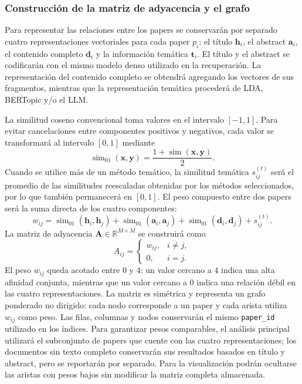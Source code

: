 \documentclass[conference]{IEEEtran}
\begin{document}
\subsubsection{Construcción de la matriz de adyacencia y el grafo}

Para representar las relaciones entre los papers se conservarán por separado cuatro representaciones vectoriales para cada paper $p_i$: el título $\mathbf{h}_i$, el abstract $\mathbf{a}_i$, el contenido completo $\mathbf{d}_i$ y la información temática $\mathbf{t}_i$. El título y el abstract se codificarán con el mismo modelo denso utilizado en la recuperación. La representación del contenido completo se obtendrá agregando los vectores de sus fragmentos, mientras que la representación temática procederá de LDA, BERTopic y/o el LLM.

La similitud coseno convencional toma valores en el intervalo $[-1,1]$. Para evitar cancelaciones entre componentes positivos y negativos, cada valor se transformará al intervalo $[0,1]$ mediante
\begin{equation}
\operatorname{sim}_{01}(\mathbf{x},\mathbf{y})=
\frac{1+\operatorname{sim}(\mathbf{x},\mathbf{y})}{2}.
\label{eq:coseno-reescalado}
\end{equation}
Cuando se utilice más de un método temático, la similitud temática $s_{ij}^{(t)}$ será el promedio de las similitudes reescaladas obtenidas por los métodos seleccionados, por lo que también permanecerá en $[0,1]$. El peso compuesto entre dos papers será la suma directa de los cuatro componentes:
\begin{equation}
w_{ij}=
\operatorname{sim}_{01}(\mathbf{h}_i,\mathbf{h}_j)
+\operatorname{sim}_{01}(\mathbf{a}_i,\mathbf{a}_j)
+\operatorname{sim}_{01}(\mathbf{d}_i,\mathbf{d}_j)
+s_{ij}^{(t)}.
\label{eq:peso-compuesto}
\end{equation}
La matriz de adyacencia $\mathbf{A}\in\mathbb{R}^{M\times M}$ se construirá como
\begin{equation}
A_{ij}=
\begin{cases}
w_{ij}, & i\neq j,\\
0, & i=j.
\end{cases}
\label{eq:adyacencia}
\end{equation}
El peso $w_{ij}$ queda acotado entre $0$ y $4$: un valor cercano a $4$ indica una alta afinidad conjunta, mientras que un valor cercano a $0$ indica una relación débil en las cuatro representaciones. La matriz es simétrica y representa un grafo ponderado no dirigido: cada nodo corresponde a un paper y cada arista utiliza $w_{ij}$ como peso. Las filas, columnas y nodos conservarán el mismo \texttt{paper\_id} utilizado en los índices. Para garantizar pesos comparables, el análisis principal utilizará el subconjunto de papers que cuente con las cuatro representaciones; los documentos sin texto completo conservarán sus resultados basados en título y abstract, pero se reportarán por separado. Para la visualización podrán ocultarse las aristas con pesos bajos sin modificar la matriz completa almacenada.
\end{document}
